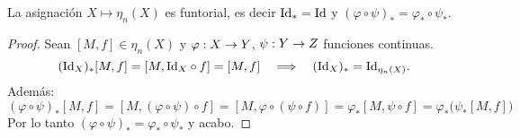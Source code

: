 \begin{ejercicio}\label{ej:39}
  La asignaci\'on $X\mapsto \eta_n(X)$ es funtorial, es decir $\text{Id}_*=\text{Id}$ y
  $(\varphi\circ \psi)_*=\varphi_*\circ \psi_*$.
\end{ejercicio}
\begin{proof}%
  Sean $[M,f]\in\eta_n(X)$ y $\varphi:X\rightarrow Y$, $\psi:Y\rightarrow Z$ funciones continuas.
  \[
    (\text{Id}_X)_*[M,f]=[M,\text{Id}_X\circ f]=[M,f] \quad\Longrightarrow\quad (\text{Id}_X)_*=\text{Id}_{\eta_n(X)}.
  \]
  Adem\'as:
  \[
    (\varphi\circ\psi)_*[M,f]=
    [M,(\varphi\circ\psi)\circ f]=
    [M,\varphi\circ(\psi\circ f)]=
    \varphi_*[M,\psi\circ f]=
    \varphi_*\big( \psi_*[M,f]  \big)
  \]
  Por lo tanto $(\varphi\circ \psi)_*=\varphi_*\circ \psi_*$ y acabo.
\end{proof}%

